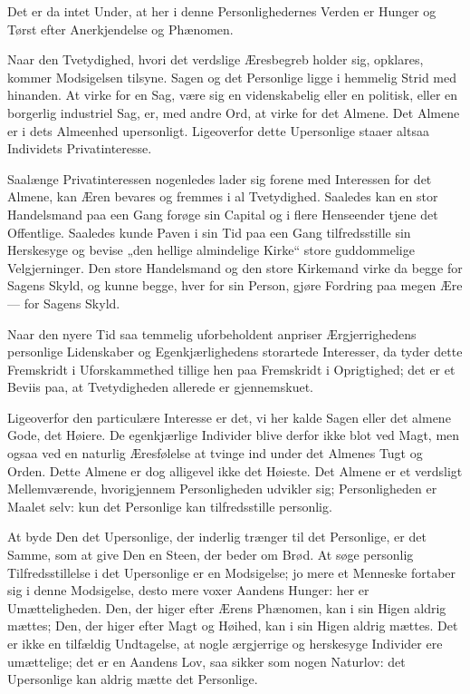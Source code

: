 \documentclass[12pt,a4paper]{book}
\newcommand{\apage}[1]{\marginnote{\footnotesize\textit{[#1]}}}
\begin{document}
Det er da intet Under, at her i denne Personlighedernes Verden er Hunger
og Tørst efter Anerkjendelse og Phænomen.

Naar den Tvetydighed, hvori det verdslige Æresbegreb holder sig, opklares,
kommer Modsigelsen tilsyne. Sagen og det Personlige ligge i hemmelig Strid
med hinanden. At \apage{30}
virke for en Sag, være sig en videnskabelig eller en politisk, eller en
borgerlig industriel Sag, er, med andre Ord, at virke for det Almene. Det
Almene er i dets Almeenhed upersonligt. Ligeoverfor dette Upersonlige
staaer altsaa Individets Privatinteresse.

Saalænge Privatinteressen nogenledes lader sig forene med Interessen for
det Almene, kan Æren bevares og fremmes i al Tvetydighed. Saaledes kan en
stor Handelsmand paa een Gang forøge sin Capital og i flere Henseender
tjene det Offentlige. Saaledes kunde Paven i sin Tid paa een Gang
tilfredsstille sin Herskesyge og bevise „den hellige almindelige Kirke“
store guddommelige Velgjerninger. Den store Handelsmand og den store
Kirkemand virke da begge for Sagens Skyld, og kunne begge, hver for sin
Person, gjøre Fordring paa megen Ære --- for Sagens Skyld.

Naar den nyere Tid saa temmelig uforbeholdent anpriser Ærgjerrighedens
personlige Lidenskaber og Egenkjærlighedens storartede Interesser, da
tyder dette Fremskridt i Uforskammethed tillige hen paa Fremskridt i
Oprigtighed; det er et Beviis paa, at Tvetydigheden allerede er
gjennemskuet.

Ligeoverfor den particulære Interesse er det, vi her kalde Sagen eller det
almene Gode, det Høiere. De egenkjærlige Individer blive derfor ikke blot
ved Magt, men ogsaa ved en naturlig Æresfølelse at tvinge ind under det
Almenes Tugt og Orden. Dette Almene er dog alligevel ikke det Høieste. Det
Almene er et verdsligt Mellemværende, hvorigjennem Personligheden udvikler
sig; Personligheden er Maalet selv: kun det Personlige kan tilfredsstille
personlig.

At byde Den det Upersonlige, der inderlig trænger til det Personlige, er
det Samme, som at give Den en Steen, der beder om Brød. At søge personlig
Tilfredsstillelse i det Upersonlige er en Modsigelse; jo mere et Menneske
fortaber sig i denne Modsigelse, desto mere voxer Aandens Hunger: her er
Umætteligheden. Den, der higer efter Ærens Phænomen, kan i sin Higen
aldrig mættes; Den, der higer efter Magt og
Høihed, kan i sin Higen aldrig mættes. Det er ikke en \apage{31} tilfældig
Undtagelse, at nogle ærgjerrige og herskesyge Individer ere umættelige;
det er en Aandens Lov, saa sikker som nogen Naturlov: det Upersonlige kan
aldrig mætte det Personlige.
\end{document}
